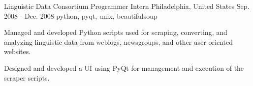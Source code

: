\cventry
    {Linguistic Data Consortium} %
    {Programmer Intern} %
    {Philadelphia, United States} %
    {Sep. 2008 - Dec. 2008} %
    { python, pyqt, unix, beautifulsoup} %
    {
    \begin{cvitems} %
        \item {Managed and developed Python scripts used for scraping, converting, and analyzing linguistic data from weblogs, newsgroups, and other user-oriented websites.}
        \item {Designed and developed a UI using PyQt for management and execution of the scraper scripts.}
    \end{cvitems}
    }